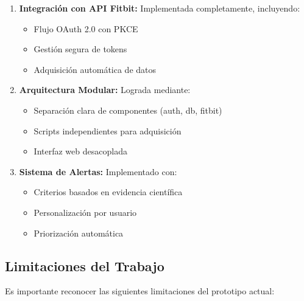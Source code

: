 \begin{enumerate}
    \item \textbf{Integración con API Fitbit:} Implementada completamente, incluyendo:
        \begin{itemize}
            \item Flujo OAuth 2.0 con PKCE
            \item Gestión segura de tokens
            \item Adquisición automática de datos
        \end{itemize}
    \item \textbf{Arquitectura Modular:} Lograda mediante:
        \begin{itemize}
            \item Separación clara de componentes (auth, db, fitbit)
            \item Scripts independientes para adquisición
            \item Interfaz web desacoplada
        \end{itemize}
    \item \textbf{Sistema de Alertas:} Implementado con:
        \begin{itemize}
            \item Criterios basados en evidencia científica
            \item Personalización por usuario
            \item Priorización automática
        \end{itemize}
\end{enumerate}

\subsection{Limitaciones del Trabajo}
\label{subsec:limitaciones}

Es importante reconocer las siguientes limitaciones del prototipo actual:

